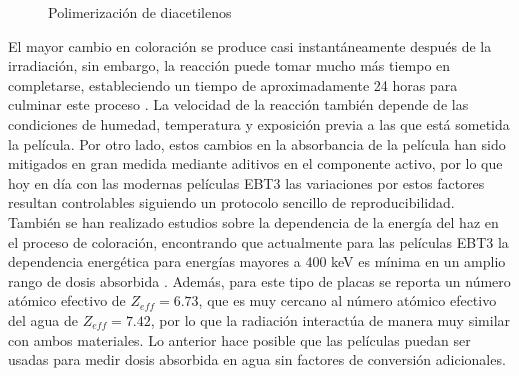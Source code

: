 \begin{figure}[H]
	\centering
	\hfill
	\caption{Polimerización de diacetilenos}
\end{figure}

El mayor cambio en coloración se produce casi instantáneamente después de la irradiación, sin embargo, la reacción puede tomar mucho más tiempo en completarse, estableciendo un tiempo de aproximadamente 24 horas para culminar este proceso \cite{Williams2011}. La velocidad de la reacción también depende de las condiciones de humedad\cite{LenMarroqun2018}, temperatura \cite{Rink2008} y exposición previa a las que está sometida la película\cite{NiroomandRad1998}. Por otro lado, estos cambios en la absorbancia de la película han sido mitigados en gran medida mediante aditivos en el componente activo, por lo que hoy en día con las modernas películas EBT3 las variaciones por estos factores resultan controlables siguiendo un protocolo sencillo de reproducibilidad. \\

También se han realizado estudios sobre la dependencia de la energía del haz en el proceso de coloración, encontrando que actualmente para las películas EBT3 la dependencia energética para energías mayores a 400 keV es mínima en un amplio rango de dosis absorbida\cite{Chemiski2010} . Además, para este tipo de placas se reporta un número atómico efectivo de $Z_{eff}=6.73$, que es muy cercano al número atómico efectivo del agua de $Z_{eff}=7.42$, por lo que la radiación interactúa de manera muy similar con ambos materiales. Lo anterior hace posible que las películas puedan ser usadas para medir dosis absorbida en agua sin factores de conversión adicionales.\\

